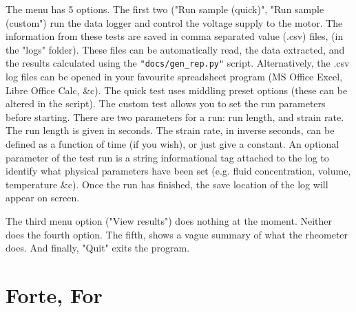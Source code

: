 \documentclass{report}
\begin{document}
		The menu has 5 options. The first two ("Run sample (quick)", "Run sample (custom") run the data logger and control the voltage supply to the motor. The information from these tests are saved in comma separated value (.csv) files, (in the "logs" folder). These files can be automatically read, the data extracted, and the results calculated using the \texttt{"docs/gen\_rep.py"} script. Alternatively, the .csv log files can be opened in your favourite spreadsheet program (MS Office Excel, Libre Office Calc, \&c). The quick test uses middling preset options (these can be altered in the script). The custom test allows you to set the run parameters before starting. There are two parameters for a run: run length, and strain rate. The run length is given in seconds. The strain rate, in inverse seconds, can be defined as a function of time (if you wish), or just give a constant. An optional parameter of the test run is a string informational tag attached to the log to identify what physical parameters have been set (e.g. fluid concentration, volume, temperature \&c). Once the run has finished, the save location of the log will appear on screen.
		
		The third menu option ("View results") does nothing at the moment. Neither does the fourth option. The fifth, shows a vague summary of what the rheometer does. And finally, "Quit" exits the program.
	
	\chapter{}
	
	\chapter{Forte, For}

	
\end{document}
